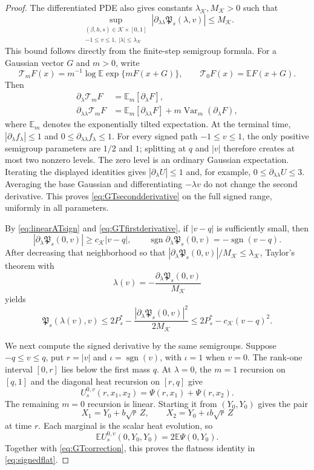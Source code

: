 \documentclass[11pt]{article}
\numberwithin{equation}{section}
\theoremstyle{plain}
\theoremstyle{definition}
\newcommand{\E}{\mathbb E}
\newcommand{\1}{\mathbf 1}
\newcommand{\cK}{\mathcal K}
\newcommand{\Var}{\operatorname{Var}}
\begin{document}
\begin{proof}
The differentiated PDE also gives constants
$\lambda_{\cK},M_{\cK}>0$ such that
\begin{equation}
 \sup_{\substack{(\beta,h,s)\in\cK\times[0,1]\\
                  -1\le v\le1,\ |\lambda|\le\lambda_{\cK}}}
 |\partial_{\lambda\lambda}\mathfrak P_s(\lambda,v)|
 \le M_{\cK}.
 \label{eq:GTsecondderivative}
\end{equation}
This bound follows directly from the finite-step semigroup formula.
For a Gaussian vector $G$ and $m>0$, write
\[
 \mathcal T_mF(x)=m^{-1}\log\E\exp\{mF(x+G)\},
 \qquad \mathcal T_0F(x)=\E F(x+G).
\]
Then
\begin{align*}
 \partial_\lambda\mathcal T_mF
 &=\E_m[\partial_\lambda F],\\
 \partial_{\lambda\lambda}\mathcal T_mF
 &=\E_m[\partial_{\lambda\lambda}F]
   +m\Var_m(\partial_\lambda F),
\end{align*}
where $\E_m$ denotes the exponentially tilted expectation.  At the
terminal time, $|\partial_\lambda f_\lambda|\le1$ and
$0\le\partial_{\lambda\lambda}f_\lambda\le1$.  For every signed path
$-1\le v\le1$, the only positive semigroup parameters are $1/2$ and
$1$; splitting at $q$ and $|v|$ therefore creates at most two
nonzero levels.  The zero level is an ordinary Gaussian expectation.
Iterating the displayed identities gives
$|\partial_\lambda U|\le1$ and, for example,
$0\le\partial_{\lambda\lambda}U\le3$.  Averaging the base Gaussian and
differentiating $-\lambda v$ do not change the second derivative.
This proves \eqref{eq:GTsecondderivative} on the full signed range,
uniformly in all parameters.

By \eqref{eq:linearATsign} and
\eqref{eq:GTfirstderivative}, if $|v-q|$ is sufficiently small, then
\[
 |\partial_\lambda\mathfrak P_s(0,v)|
 \ge c_{\cK}|v-q|,
 \qquad
 \operatorname{sgn}\partial_\lambda\mathfrak P_s(0,v)
 =-\operatorname{sgn}(v-q).
\]
After decreasing that neighborhood so that
$|\partial_\lambda\mathfrak P_s(0,v)|/M_{\cK}\le\lambda_{\cK}$,
Taylor's theorem with
\[
 \lambda(v)=-\frac{
 \partial_\lambda\mathfrak P_s(0,v)}{M_{\cK}}
\]
yields
\begin{equation}
 \mathfrak P_s(\lambda(v),v)
 \le2P_s^*-\frac{
 |\partial_\lambda\mathfrak P_s(0,v)|^2}{2M_{\cK}}
 \le2P_s^*-c_{\cK}(v-q)^2.
 \label{eq:localGTgap}
\end{equation}

We next compute the signed derivative by the same semigroups.  Suppose
$-q\le v\le q$, put $r=|v|$ and
$\iota=\operatorname{sgn}(v)$, with $\iota=1$ when $v=0$.  The
rank-one interval $[0,r]$ lies below the first mass $q$.  At
$\lambda=0$, the $m=1$ recursion on $[q,1]$ and the diagonal heat
recursion on $[r,q]$ give
\[
 U_s^{0,v}(r,x_1,x_2)=\Psi(r,x_1)+\Psi(r,x_2).
\]
The remaining $m=0$ recursion is linear.  Starting it from
$(Y_0,Y_0)$ gives the pair
\[
 X_1=Y_0+b\sqrt r\,Z,\qquad
 X_2=Y_0+\iota b\sqrt r\,Z
\]
at time $r$.  Each marginal is the scalar heat evolution, so
\[
 \E U_s^{0,v}(0,Y_0,Y_0)=2\E\Psi(0,Y_0).
\]
Together with \eqref{eq:GTcorrection}, this proves the flatness
identity in \eqref{eq:signedflat}.


\end{proof}
\end{document}
